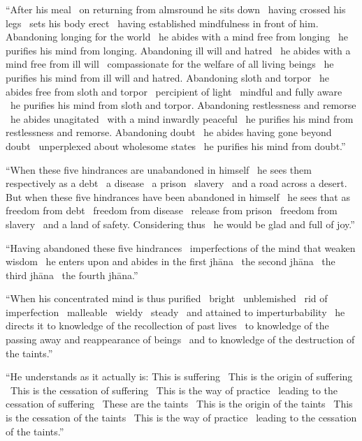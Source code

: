 “After his meal \breathmark\ on returning from almsround he sits down \breathmark\ having crossed his legs \breathmark\ sets his body erect \breathmark\ having established mindfulness in front of him. Abandoning longing
for the world \breathmark\ he abides with a mind free from longing \breathmark\ he purifies his mind from longing. Abandoning ill will and hatred \breathmark\ he abides with a mind free from ill will \breathmark\ compassionate for the welfare of all living beings \breathmark\ he purifies his mind from ill will and hatred. Abandoning sloth and torpor \breathmark\ he abides free from sloth and torpor \breathmark\ percipient of light \breathmark\ mindful and fully aware \breathmark\ he purifies his mind from sloth and torpor. Abandoning restlessness and remorse \breathmark\ he abides unagitated \breathmark\ with a mind inwardly peaceful \breathmark\ he purifies his mind from restlessness and remorse. Abandoning doubt \breathmark\ he abides having gone beyond doubt \breathmark\ unperplexed about wholesome states \breathmark\ he purifies his mind from doubt.”

\suttaRef{[MN 107]}

“When these five hindrances are unabandoned in himself \breathmark\ he sees them respectively as a debt \breathmark\ a disease \breathmark\ a prison \breathmark\ slavery \breathmark\ and a road across a desert. But when these five hindrances have been abandoned in himself \breathmark\ he sees that as freedom from debt \breathmark\ freedom from disease \breathmark\ release from prison \breathmark\ freedom from slavery \breathmark\ and a land of safety. Considering thus \breathmark\ he would be glad and full of joy.”

“Having abandoned these five hindrances \breathmark\ imperfections of the mind that weaken wisdom \breathmark\ he enters upon and abides in the first jhāna \breathmark\ the second jhāna \breathmark\ the third jhāna \breathmark\ the fourth jhāna.”

“When his concentrated mind is thus purified \breathmark\ bright \breathmark\ unblemished \breathmark\ rid of imperfection \breathmark\ malleable \breathmark\ wieldy \breathmark\ steady \breathmark\ and attained to imperturbability \breathmark\ he directs it to knowledge of the recollection of past lives \breathmark\ to knowledge of the passing away and reappearance of beings \breathmark\ and to knowledge of the destruction of the taints.”

“He understands as it actually is: This is suffering \breathmark\ This is the origin of suffering \breathmark\ This is the cessation of suffering \breathmark\ This is the way of practice \breathmark\ leading to the cessation of suffering \breathmark\ These are the taints \breathmark\ This is the origin of the taints \breathmark\ This is the cessation of the taints \breathmark\ This is the way of practice \breathmark\ leading to the cessation of the taints.”

